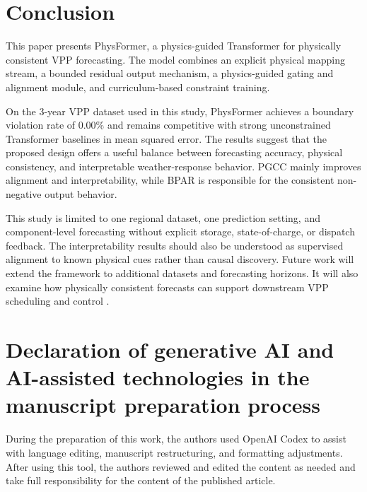 \section{Conclusion}
\label{sec:conclusion}

This paper presents PhysFormer, a physics-guided Transformer for physically consistent VPP forecasting. The model combines an explicit physical mapping stream, a bounded residual output mechanism, a physics-guided gating and alignment module, and curriculum-based constraint training.

On the 3-year VPP dataset used in this study, PhysFormer achieves a boundary violation rate of 0.00\% and remains competitive with strong unconstrained Transformer baselines in mean squared error. The results suggest that the proposed design offers a useful balance between forecasting accuracy, physical consistency, and interpretable weather-response behavior. PGCC mainly improves alignment and interpretability, while BPAR is responsible for the consistent non-negative output behavior.

This study is limited to one regional dataset, one prediction setting, and component-level forecasting without explicit storage, state-of-charge, or dispatch feedback. The interpretability results should also be understood as supervised alignment to known physical cues rather than causal discovery. Future work will extend the framework to additional datasets and forecasting horizons. It will also examine how physically consistent forecasts can support downstream VPP scheduling and control \cite{Ma2025,Arabzadeh2025,Du2025}.

\section*{Declaration of generative AI and AI-assisted technologies in the manuscript preparation process}
During the preparation of this work, the authors used OpenAI Codex to assist with language editing, manuscript restructuring, and formatting adjustments. After using this tool, the authors reviewed and edited the content as needed and take full responsibility for the content of the published article.
